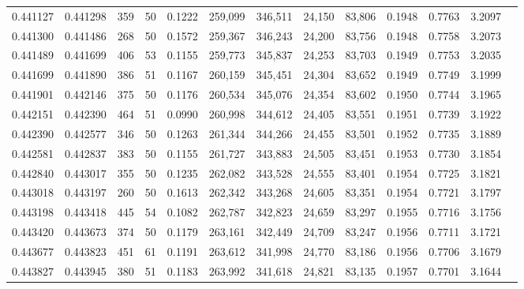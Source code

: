 \begin{tabular}{rrrrrrrrrrrrr}
0.441127 & 0.441298 &   359 &  50 &                                     0.1222 & 259,099 & 346,511 &  24,150 &  83,806 & 0.1948 & 0.7763 & 3.2097 \\
0.441300 & 0.441486 &   268 &  50 &                                     0.1572 & 259,367 & 346,243 &  24,200 &  83,756 & 0.1948 & 0.7758 & 3.2073 \\
0.441489 & 0.441699 &   406 &  53 &                                     0.1155 & 259,773 & 345,837 &  24,253 &  83,703 & 0.1949 & 0.7753 & 3.2035 \\
0.441699 & 0.441890 &   386 &  51 &                                     0.1167 & 260,159 & 345,451 &  24,304 &  83,652 & 0.1949 & 0.7749 & 3.1999 \\
0.441901 & 0.442146 &   375 &  50 &                                     0.1176 & 260,534 & 345,076 &  24,354 &  83,602 & 0.1950 & 0.7744 & 3.1965 \\
0.442151 & 0.442390 &   464 &  51 &                                     0.0990 & 260,998 & 344,612 &  24,405 &  83,551 & 0.1951 & 0.7739 & 3.1922 \\
0.442390 & 0.442577 &   346 &  50 &                                     0.1263 & 261,344 & 344,266 &  24,455 &  83,501 & 0.1952 & 0.7735 & 3.1889 \\
0.442581 & 0.442837 &   383 &  50 &                                     0.1155 & 261,727 & 343,883 &  24,505 &  83,451 & 0.1953 & 0.7730 & 3.1854 \\
0.442840 & 0.443017 &   355 &  50 &                                     0.1235 & 262,082 & 343,528 &  24,555 &  83,401 & 0.1954 & 0.7725 & 3.1821 \\
0.443018 & 0.443197 &   260 &  50 &                                     0.1613 & 262,342 & 343,268 &  24,605 &  83,351 & 0.1954 & 0.7721 & 3.1797 \\
0.443198 & 0.443418 &   445 &  54 &                                     0.1082 & 262,787 & 342,823 &  24,659 &  83,297 & 0.1955 & 0.7716 & 3.1756 \\
0.443420 & 0.443673 &   374 &  50 &                                     0.1179 & 263,161 & 342,449 &  24,709 &  83,247 & 0.1956 & 0.7711 & 3.1721 \\
0.443677 & 0.443823 &   451 &  61 &                                     0.1191 & 263,612 & 341,998 &  24,770 &  83,186 & 0.1956 & 0.7706 & 3.1679 \\
0.443827 & 0.443945 &   380 &  51 &                                     0.1183 & 263,992 & 341,618 &  24,821 &  83,135 & 0.1957 & 0.7701 & 3.1644 \\

\end{tabular}
